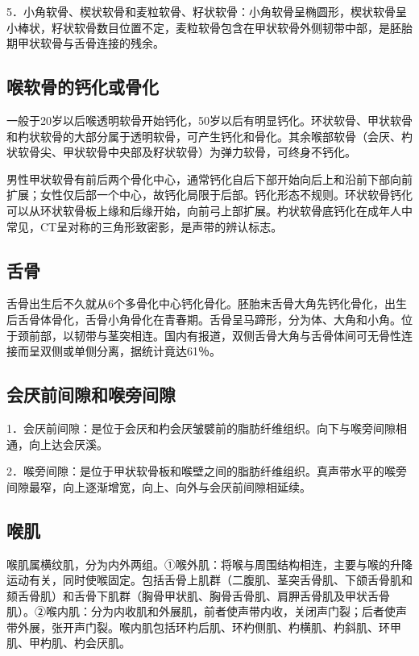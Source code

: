5．小角软骨、楔状软骨和麦粒软骨、籽状软骨：小角软骨呈椭圆形，楔状软骨呈小棒状，籽状软骨数目位置不定，麦粒软骨包含在甲状软骨外侧韧带中部，是胚胎期甲状软骨与舌骨连接的残余。

\subsection{喉软骨的钙化或骨化}

一般于20岁以后喉透明软骨开始钙化，50岁以后有明显钙化。环状软骨、甲状软骨和杓状软骨的大部分属于透明软骨，可产生钙化和骨化。其余喉部软骨（会厌、杓状软骨尖、甲状软骨中央部及籽状软骨）为弹力软骨，可终身不钙化。

男性甲状软骨有前后两个骨化中心，通常钙化自后下部开始向后上和沿前下部向前扩展；女性仅后部一个中心，故钙化局限于后部。钙化形态不规则。环状软骨钙化可以从环状软骨板上缘和后缘开始，向前弓上部扩展。杓状软骨底钙化在成年人中常见，CT呈对称的三角形致密影，是声带的辨认标志。

\subsection{舌骨}

舌骨出生后不久就从6个多骨化中心钙化骨化。胚胎末舌骨大角先钙化骨化，出生后舌骨体骨化，舌骨小角骨化在青春期。舌骨呈马蹄形，分为体、大角和小角。位于颈前部，以韧带与茎突相连。国内有报道，双侧舌骨大角与舌骨体间可无骨性连接而呈双侧或单侧分离，据统计竟达61％。

\subsection{会厌前间隙和喉旁间隙}

1．会厌前间隙：是位于会厌和杓会厌皱襞前的脂肪纤维组织。向下与喉旁间隙相通，向上达会厌溪。

2．喉旁间隙：是位于甲状软骨板和喉壁之间的脂肪纤维组织。真声带水平的喉旁间隙最窄，向上逐渐增宽，向上、向外与会厌前间隙相延续。

\subsection{喉肌}

喉肌属横纹肌，分为内外两组。①喉外肌：将喉与周围结构相连，主要与喉的升降运动有关，同时使喉固定。包括舌骨上肌群（二腹肌、茎突舌骨肌、下颌舌骨肌和颏舌骨肌）和舌骨下肌群（胸骨甲状肌、胸骨舌骨肌、肩胛舌骨肌及甲状舌骨肌）。②喉内肌：分为内收肌和外展肌，前者使声带内收，关闭声门裂；后者使声带外展，张开声门裂。喉内肌包括环杓后肌、环杓侧肌、杓横肌、杓斜肌、环甲肌、甲杓肌、杓会厌肌。

